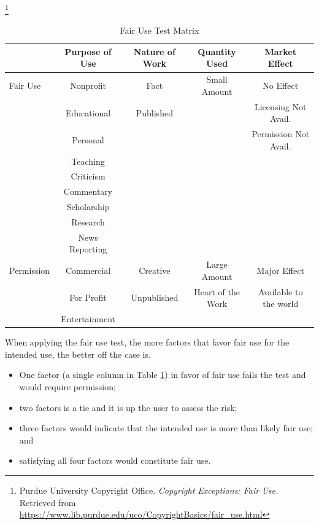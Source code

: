 \documentclass[letterpaper,11pt]{texMemo}
\begin{document}
  \begin{table}
  \centering
  \caption{Fair Use Test Matrix}
     \footnote{Purdue University Copyright Office. \emph{Copyright Exceptions: Fair Use.} Retrieved from \href{https://www.lib.purdue.edu/uco/CopyrightBasics/fair_use.html}{https://www.lib.purdue.edu/uco/CopyrightBasics/fair_use.html}
    }
  \vspace{2ex}
  \begin{tabularx}{\linewidth}{|X|c|c|c|c|} \hline
   & Purpose of Use & Nature of Work & Quantity Used & Market Effect\\ \hline\hline
   Fair Use & Nonprofit & Fact & Small Amount & No Effect \\
   & Educational & Published & & Licensing Not Avail. \\
   & Personal & & & Permission Not Avail. \\
   & Teaching & & & \\
   & Criticism & & & \\
   & Commentary & & & \\
   & Scholarship & & & \\
   & Research & & & \\
   & News Reporting & & & \\ \hline \hline
  Permission & Commercial & Creative & Large Amount & Major Effect \\
    & For Profit & Unpublished & Heart of the Work & Available to the world \\
    & Entertainment & & & \\ \hline
\end{tabularx}
  \label{tab:fair-use-test}
  \end{table}

 When applying the fair use test, the more factors that favor fair use for the intended use, the better off the case is.
    \begin{itemize}
        \item One factor (a single column in Table \ref{tab:fair-use-test}) in favor of fair use fails the test and would require permission;
        \item two factors is a tie and it is up the user to assess the risk;
        \item three factors would indicate that the intended use is more than likely fair use; and
        \item satisfying all four factors would constitute fair use.
    \end{itemize}
\end{document}
